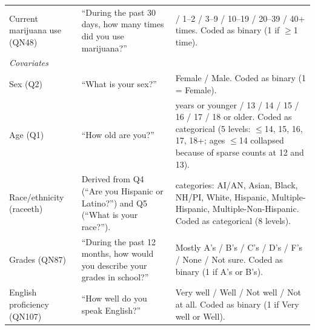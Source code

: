 \documentclass[12pt]{article}
\begin{document}
\begin{landscape}
\begin{longtable}{>{\raggedright\arraybackslash}p{2.2in} >{\raggedright\arraybackslash}p{4.0in} >{\raggedright\arraybackslash}p{2.8in}}
Current marijuana use (QN48) &
``During the past 30 days, how many times did you use marijuana?'' &
0 / 1--2 / 3--9 / 10--19 / 20--39 / 40+ times.
Coded as binary (1 if $\geq$1 time). \\

\addlinespace[6pt]
\textit{Covariates} \\
\addlinespace[2pt]

Sex (Q2) &
``What is your sex?'' &
Female / Male. Coded as binary (1 = Female). \\
\addlinespace[3pt]

Age (Q1) &
``How old are you?'' &
12 years or younger / 13 / 14 / 15 / 16 / 17 / 18 or older.
Coded as categorical (5 levels: $\leq$14, 15, 16, 17, 18+; ages $\leq$14 collapsed
because of sparse counts at 12 and 13). \\
\addlinespace[3pt]

Race/ethnicity (raceeth) &
Derived from Q4 (``Are you Hispanic or Latino?'') and Q5 (``What is your race?''). &
8 categories: AI/AN, Asian, Black, NH/PI, White, Hispanic, Multiple-Hispanic,
Multiple-Non-Hispanic.
Coded as categorical (8 levels). \\
\addlinespace[3pt]

Grades (QN87) &
``During the past 12 months, how would you describe your grades in school?'' &
Mostly A's / B's / C's / D's / F's / None / Not sure.
Coded as binary (1 if A's or B's). \\
\addlinespace[3pt]

English proficiency (QN107) &
``How well do you speak English?'' &
Very well / Well / Not well / Not at all.
Coded as binary (1 if Very well or Well). \\

\end{longtable}
\doublespacing
\normalsize
\end{landscape}
\end{document}
